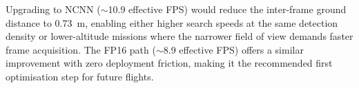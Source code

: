 Upgrading to NCNN (${\sim}$10.9 effective FPS) would reduce the inter-frame ground distance to \SI{0.73}{\metre}, enabling either higher search speeds at the same detection density or lower-altitude missions where the narrower field of view demands faster frame acquisition.  The FP16 path (${\sim}$8.9 effective FPS) offers a similar improvement with zero deployment friction, making it the recommended first optimisation step for future flights.
